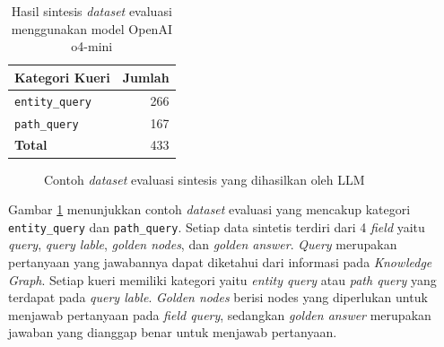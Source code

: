 \begin{table}[H]
	\centering
	\caption{Hasil sintesis \textit{dataset} evaluasi menggunakan model OpenAI o4-mini}
	\label{tab:evaluation-dataset-result}
	\begin{tabular}{|l|r|}
		\hline
		\textbf{Kategori Kueri} & \textbf{Jumlah} \\
		\hline \hline
		\texttt{entity\_query}  &
		266                                       \\
		\hline
		\texttt{path\_query}    &
		167                                       \\
		\hline
		\textbf{Total}          &
		433                                       \\
		\hline
	\end{tabular}
\end{table}


\begin{figure}[H]
	\centering
	\caption{Contoh \textit{dataset} evaluasi sintesis yang dihasilkan oleh LLM}
	\label{fig:evaluation-dataset-example}
\end{figure}

Gambar \ref{fig:evaluation-dataset-example} menunjukkan contoh \textit{dataset} evaluasi yang mencakup kategori \\ \texttt{entity\_query} dan \texttt{path\_query}.
Setiap data sintetis terdiri dari 4 \textit{field} yaitu \textit{query}, \textit{query lable}, \textit{golden nodes}, dan \textit{golden answer}.
\textit{Query} merupakan pertanyaan yang jawabannya dapat diketahui dari informasi pada \textit{Knowledge Graph}.
Setiap kueri memiliki kategori yaitu \textit{entity query} atau \textit{path query} yang terdapat pada \textit{query lable}.
\textit{Golden nodes} berisi nodes yang diperlukan untuk menjawab pertanyaan pada \textit{field query}, sedangkan \textit{golden answer} merupakan jawaban yang dianggap benar untuk menjawab pertanyaan.

